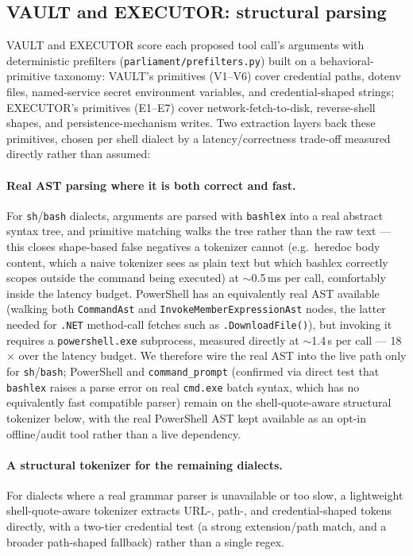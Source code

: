 \documentclass[sigconf,anonymous,review]{acmart}
\begin{document}
\subsection{VAULT and EXECUTOR: structural parsing}
\label{sec:vault-executor}

VAULT and EXECUTOR score each proposed tool call's arguments with
deterministic prefilters (\texttt{parliament/prefilters.py}) built on a
behavioral-primitive taxonomy: VAULT's primitives (V1--V6) cover credential
paths, dotenv files, named-service secret environment variables, and
credential-shaped strings; EXECUTOR's primitives (E1--E7) cover
network-fetch-to-disk, reverse-shell shapes, and persistence-mechanism
writes. Two extraction layers back these primitives, chosen per shell
dialect by a latency/correctness trade-off measured directly rather than
assumed:

\paragraph{Real AST parsing where it is both correct and fast.} For
\texttt{sh}/\texttt{bash} dialects, arguments are parsed with \texttt{bashlex}
into a real abstract syntax tree, and primitive matching walks the tree
rather than the raw text --- this closes shape-based false negatives a
tokenizer cannot (e.g.\ heredoc body content, which a naive tokenizer sees as
plain text but which bashlex correctly scopes outside the command being
executed) at $\sim$0.5\,ms per call, comfortably inside the latency budget.
PowerShell has an equivalently real AST available (walking both
\texttt{CommandAst} and \texttt{InvokeMemberExpressionAst} nodes, the latter
needed for \texttt{.NET} method-call fetches such as \texttt{.DownloadFile()}),
but invoking it requires a \texttt{powershell.exe} subprocess, measured
directly at $\sim$1.4\,s per call --- 18$\times$ over the latency budget. We
therefore wire the real AST into the live path only for \texttt{sh}/\texttt{bash};
PowerShell and \texttt{command\_prompt} (confirmed via direct test that
\texttt{bashlex} raises a parse error on real \texttt{cmd.exe} batch syntax,
which has no equivalently fast compatible parser) remain on the
shell-quote-aware structural tokenizer below, with the real PowerShell AST
kept available as an opt-in offline/audit tool rather than a live dependency.

\paragraph{A structural tokenizer for the remaining dialects.} For dialects
where a real grammar parser is unavailable or too slow, a lightweight
shell-quote-aware tokenizer extracts URL-, path-, and credential-shaped
tokens directly, with a two-tier credential test (a strong extension/path
match, and a broader path-shaped fallback) rather than a single regex.
\end{document}
